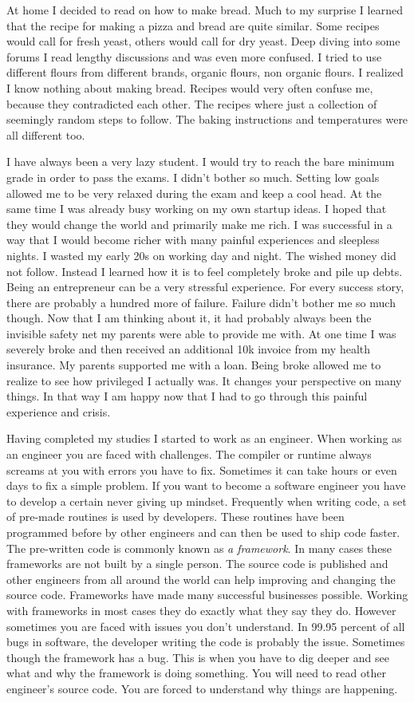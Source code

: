 At home I decided to read on how to make bread. Much to my surprise I learned
that the recipe for making a pizza and bread are quite similar. Some recipes
would call for fresh yeast, others would call for dry yeast. Deep diving
into some forums I read lengthy discussions and was even more confused.
I tried to use different flours from different brands, organic flours,
non organic flours. I realized I know nothing about making bread. Recipes
would very often confuse me, because they contradicted each other. The recipes
where just a collection of seemingly random steps to follow. The baking instructions
and temperatures were all different too.

I have always been a very lazy student. I would try to reach the bare minimum
grade in order to pass the exams. I didn't bother so much. Setting low goals
allowed me to be very relaxed during the exam and keep a cool head. At the
same time I was already busy working on my own startup ideas. I hoped that they would change
the world and primarily make me rich. I was successful in a way that I would become
richer with many painful experiences and sleepless nights. I wasted my early
20s on working day and night. The wished money did not follow. Instead
I learned how it is to feel completely broke and pile up debts. Being
an entrepreneur can be a very stressful experience. For every success story,
there are probably a hundred more of failure. Failure didn't bother me so much though.
Now that I am thinking about it, it had probably always been the invisible
safety net my parents were able to provide me with. At one time I was
severely broke and then received an additional 10k invoice from my health insurance.
My parents supported me with a loan. Being broke allowed me to realize
to see how privileged I actually was. It changes your perspective on many things.
In that way I am happy now that I had to go through this painful experience and crisis.

Having completed my studies I started to work as an engineer.
When working as an engineer you are faced with challenges. The compiler or runtime
always screams at you with errors you have to fix. Sometimes it can take hours or
even days to fix a simple problem. If you want to become a software engineer
you have to develop a certain never giving up mindset. Frequently when writing code,
a set of pre-made routines is used by developers. These routines have been
programmed before by other engineers and can then be used to ship code faster.
The pre-written code is commonly known as {\it a framework}. In many cases
these frameworks are not built by a single person. The source code is published
and other engineers from all around the world can help improving and changing
the source code. Frameworks have made many successful businesses possible. Working
with frameworks in most cases they do exactly what they say they do. However
sometimes you are faced with issues you don't understand. In 99.95 percent
of all bugs in software, the developer writing the code is probably the issue.
Sometimes though the framework has a bug. This is when you have to dig deeper and
see what and why the framework is doing something. You will need to read other
engineer's source code. You are forced to understand why things are happening.

